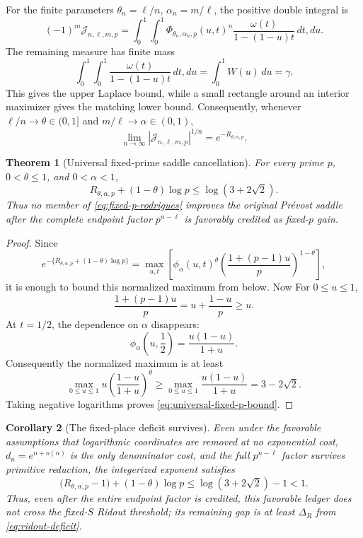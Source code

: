 \documentclass[11pt]{article}
\theoremstyle{keio}
\newtheorem{theorem}{Theorem}[section]
\newtheorem{corollary}[theorem]{Corollary}
\theoremstyle{definition}
\theoremstyle{remark}
\begin{document}
For the finite parameters \(\theta_n=\ell/n\),
\(\alpha_n=m/\ell\), the positive double integral is
\[
 (-1)^m\mathcal J_{n,\ell,m,p}
 =\int_0^1\!\int_0^1
 \Phi_{\theta_n,\alpha_n,p}(u,t)^n
 \frac{\omega(t)}{1-(1-u)t}\,dt,du.
\]
The remaining measure has finite mass
\[
 \int_0^1\!\int_0^1
 \frac{\omega(t)}{1-(1-u)t}\,dt,du
 =\int_0^1W(u)\,du=\gamma.
\]
This gives the upper Laplace bound, while a small rectangle around an
interior maximizer gives the matching lower bound.  Consequently,
whenever \(\ell/n\to\theta\in(0,1]\) and
\(m/\ell\to\alpha\in(0,1)\),
\begin{equation}\label{eq:fixed-p-laplace}
 \lim_{n\to\infty}|\mathcal J_{n,\ell,m,p}|^{1/n}
 =e^{-R_{\theta,\alpha,p}}.
\end{equation}

\begin{theorem}[Universal fixed-prime saddle cancellation]
\label{thm:universal-fixed-p-cancellation}
For every prime \(p\), \(0<\theta\le1\), and \(0<\alpha<1\),
\begin{equation}\label{eq:universal-fixed-p-bound}
 \boxed{\displaystyle
 R_{\theta,\alpha,p}+(1-\theta)\log p
 \le\log(3+2\sqrt2).}
\end{equation}
Thus no member of \eqref{eq:fixed-p-rodrigues} improves the original
Pr\'evost saddle after the complete endpoint factor
\(p^{n-\ell}\) is favorably credited as fixed-\(p\) gain.
\end{theorem}

\begin{proof}
Since
\[
 e^{-\{R_{\theta,\alpha,p}+(1-\theta)\log p\}}
 =\max_{u,t}
 \left[
  \phi_\alpha(u,t)^\theta
  \left(\frac{1+(p-1)u}{p}\right)^{1-\theta}
 \right],
\]
it is enough to bound this normalized maximum from below.  Now
For \(0\le u\le1\),
\[
 \frac{1+(p-1)u}{p}=u+\frac{1-u}{p}\ge u.
\]
At \(t=1/2\), the dependence on \(\alpha\) disappears:
\[
 \phi_\alpha\!\left(u,\frac12\right)
 =\frac{u(1-u)}{1+u}.
\]
Consequently the normalized maximum is at least
\[
 \max_{0\le u\le1}
 u\left(\frac{1-u}{1+u}\right)^\theta
 \ge\max_{0\le u\le1}\frac{u(1-u)}{1+u}
 =3-2\sqrt2.
\]
Taking negative logarithms proves \eqref{eq:universal-fixed-p-bound}.
\end{proof}

\begin{corollary}[The fixed-place deficit survives]
\label{cor:fixed-p-deficit}
Even under the favorable assumptions that logarithmic coordinates are
removed at no exponential cost, \(d_n=e^{n+o(n)}\) is the only denominator
cost, and the full \(p^{n-\ell}\) factor survives primitive reduction, the
integerized exponent satisfies
\[
 \bigl(R_{\theta,\alpha,p}-1\bigr)+(1-\theta)\log p
 \le\log(3+2\sqrt2)-1<1.
\]
Thus, even after the entire endpoint factor is credited, this favorable
ledger does not cross the fixed-\(S\) Ridout threshold; its remaining gap is
at least \(\Delta_R\) from \eqref{eq:ridout-deficit}.
\end{corollary}
\end{document}

